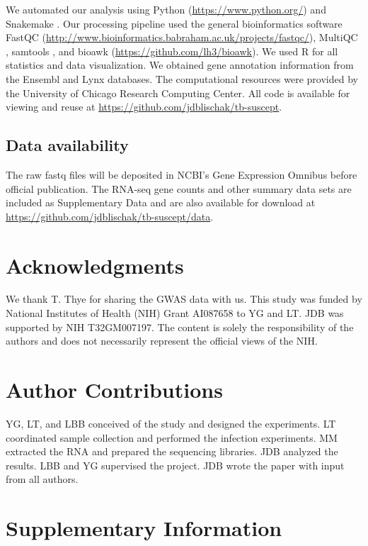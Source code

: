 We automated our analysis using Python (\url{https://www.python.org/}) and
Snakemake \citep{Koster2012}. Our processing pipeline used the general
bioinformatics software FastQC
(\url{http://www.bioinformatics.babraham.ac.uk/projects/fastqc/}), MultiQC
\citep{Ewels2016}, samtools \citep{Li2009}, and bioawk
(\url{https://github.com/lh3/bioawk}). We used R \citep{R2015} for all
statistics and data visualization. We obtained gene annotation
information from the Ensembl \citep{Yates2016} and Lynx
\citep{Sulakhe2016} databases. The computational resources were
provided by the University of Chicago Research Computing Center. All
code is available for viewing and reuse at
\url{https://github.com/jdblischak/tb-suscept}.
\subsection{Data availability}

The raw fastq files will be deposited in NCBI's Gene Expression
Omnibus \citep{Edgar2002} before official publication.
The RNA-seq gene counts and other summary
data sets are included as Supplementary Data and are also available
for download at \url{https://github.com/jdblischak/tb-suscept/data}.
\section{Acknowledgments}

We thank T. Thye for sharing the GWAS data with us. This study was
funded by National Institutes of Health (NIH) Grant AI087658 to YG and
LT. JDB was supported by NIH T32GM007197. The content is solely the
responsibility of the authors and does not necessarily represent the
official views of the NIH.
\section{Author Contributions}

YG, LT, and LBB conceived of the study and designed the experiments.
LT coordinated sample collection and performed the infection
experiments. MM extracted the RNA and prepared the sequencing
libraries. JDB analyzed the results. LBB and YG supervised the
project. JDB wrote the paper with input from all authors.

\clearpage\newpage
\section{Supplementary Information}\label{ch03-supplementary-information}

